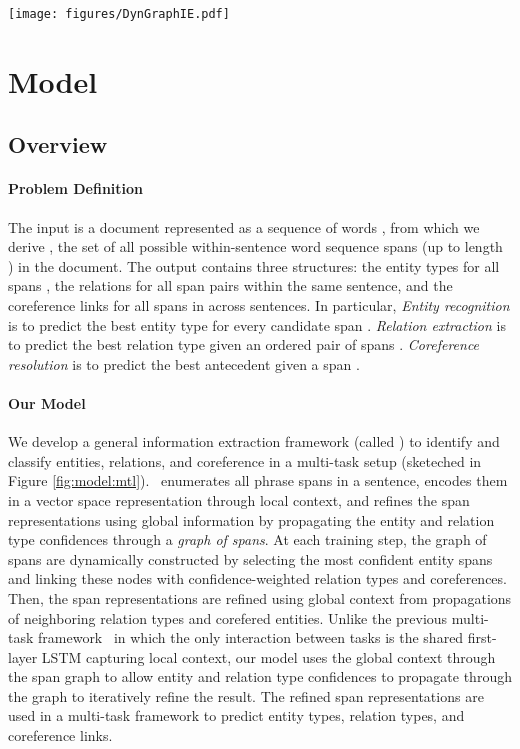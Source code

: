 
\begin{figure*}[t]
\centering
\texttt{[image: figures/DynGraphIE.pdf]}
\caption{
Overview of our \sys\ model. Dotted arcs indicate confidence weighted graph edges. Solid lines indicate the final predictions.
}\label{fig:model:mtl}
\vspace{-1em}
\end{figure*} 
\section{Model}


\subsection{Overview}
\paragraph{Problem Definition} The input is a document represented as a sequence of words , from which we derive
, the set of all possible within-sentence word sequence spans (up to length ) in the document.
The output contains three structures: 
the entity types  for all spans , 
the relations  for all span pairs  within the same sentence, and the coreference links  for all spans in  across sentences.  
 In particular, {\it Entity recognition} is to predict the best entity type  for every candidate span . {\it Relation extraction} is to predict  the best relation type  given an ordered pair of spans . {\it Coreference resolution} is to predict the best antecedent   given a span . 


\paragraph{Our Model} We develop a general information extraction framework (called \sys) to identify and classify  entities, relations, and coreference in a multi-task setup (sketeched in Figure \ref{fig:model:mtl}). \sys\  enumerates all phrase spans in a sentence, encodes them in a vector space representation through local context, and refines the span representations using global information by propagating the entity and relation type confidences through a {\it graph of spans}. At each  training step, the graph of spans are dynamically constructed by selecting the most confident entity spans and linking these nodes with confidence-weighted relation types and coreferences.  Then, the span representations are refined using global context from  propagations of  neighboring relation types and corefered entities.  Unlike the previous multi-task framework~\cite{luan2018multi} in which the only interaction between tasks is the shared first-layer LSTM capturing local context, our model uses the global context through the span graph to  allow entity and relation type confidences to propagate through the graph to iteratively refine the result. The refined span representations are used in a multi-task framework to predict entity types, relation types, and coreference links. 


